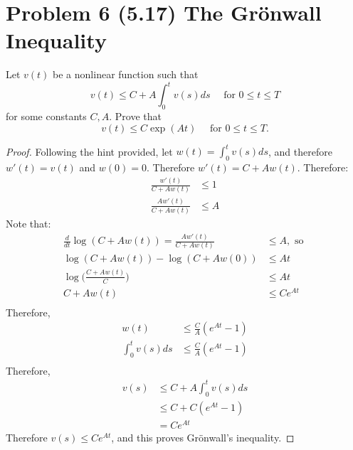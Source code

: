 \documentclass[11pt]{article}
\begin{document}
 \section*{Problem 6 (5.17) The Gr\"{o}nwall Inequality}
 Let $v(t)$ be a nonlinear function such that  $$v ( t ) \leq C + A \int _ { 0 } ^ { t } v ( s ) d s \quad \text { for } 0 \leq t \leq T$$ for some constants $C,A$.  Prove that $$v ( t ) \leq C \exp ( A t ) \quad \text { for } 0 \leq t \leq T.$$
 \begin{proof}
Following the hint provided, let $w(t) = \int_0^t v(s) ds$, and therefore $w'(t) = v(t)$ and $w(0)=0$.  Therefore $w'(t) = C+ Aw(t)$.  Therefore:
\begin{align*}
\frac{w'(t)}{C+Aw(t)} &\leq 1\\
\frac{A w'(t)}{C+ Aw(t)} & \leq A
\end{align*}
Note that:
\begin{align*}
\frac{d}{dt} \log(C+Aw(t)) = \frac{A w'(t)}{C+ Aw(t)} &\leq A, \text{ so } \\
\log(C+ Aw(t))-\log(C+Aw(0)) &\leq At \\
\log \Big( \frac{C+Aw(t)}{C} \Big) &\leq At\\
C+Aw(t)  &\leq Ce^{At}\\
\end{align*}
Therefore,
\begin{align*}
w(t) & \leq \frac{C}{A}(e^{At}-1) \\
\int_0^t v(s) ds & \leq \frac{C}{A}(e^{At}-1) \\
\end{align*}
Therefore,
\begin{align*}
v(s) &\leq C+ A \int_0^t v(s) ds\\ &\leq C + C(e^{At}-1)\\
& = Ce^{At}
\end{align*}
Therefore $v(s) \leq Ce^{At}$, and this proves Gr\"{o}nwall's inequality.
\end{proof}
\end{document}
